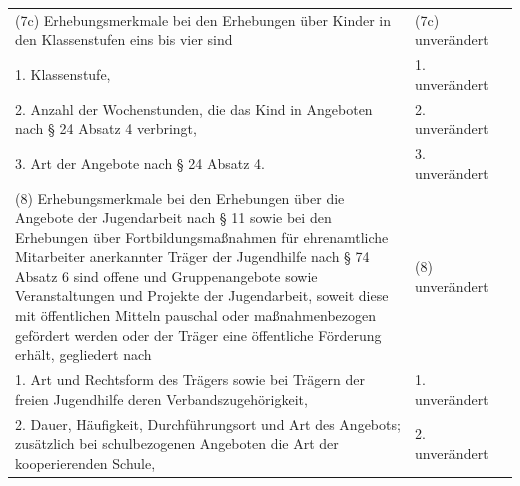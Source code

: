 \documentclass[10pt,a4paper,landscape]{article}
\begin{document}
\begin{longtable}{|L{8.2cm}|L{8.2cm}|L{8.2cm}|}
\hhline{|---|}
(7c) Erhebungsmerkmale bei den  \newline Erhebungen über Kinder in den  \newline Klassenstufen eins bis vier sind & (7c) unverändert &  \\
\hhline{|---|}
1.   \newline Klassenstufe, & 1. unverändert &  \\
\hhline{|---|}
2.   \newline Anzahl der Wochenstunden, die das Kind in  \newline Angeboten nach \S{} 24 Absatz 4 verbringt, & 2. unverändert &  \\
\hhline{|---|}
3.   \newline Art der Angebote nach \S{} 24 Absatz 4. & 3. unverändert &  \\
\hhline{|---|}
(8) Erhebungsmerkmale bei den  \newline Erhebungen über die Angebote der  \newline Jugendarbeit nach \S{} 11 sowie bei den  \newline Erhebungen über Fortbildungsmaßnahmen  \newline für ehrenamtliche Mitarbeiter anerkannter  \newline Träger der Jugendhilfe nach \S{} 74 Absatz 6  \newline sind offene und Gruppenangebote sowie  \newline Veranstaltungen und Projekte der  \newline Jugendarbeit, soweit diese mit öffentlichen  \newline Mitteln pauschal oder maßnahmenbezogen  \newline gefördert werden oder der Träger eine  \newline öffentliche Förderung erhält, gegliedert  \newline nach & (8) unverändert &  \\
\hhline{|---|}
1.   \newline Art und Rechtsform des Trägers sowie bei  \newline Trägern der freien Jugendhilfe deren  \newline Verbandszugehörigkeit, & 1. unverändert &  \\
\hhline{|---|}
2.   \newline Dauer, Häufigkeit, Durchführungsort und  \newline Art des Angebots; zusätzlich bei  \newline schulbezogenen Angeboten die Art der  \newline kooperierenden Schule, & 2. unverändert &  \\

\end{longtable}
\end{document}

